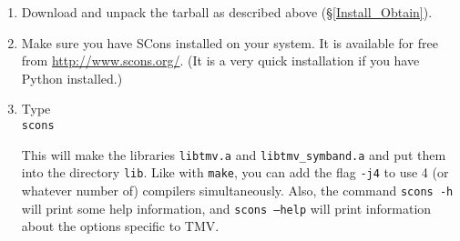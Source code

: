 \documentclass[twoside,letterpaper,11pt]{article}
\begin{document}
\begin{enumerate}
\item Download and unpack the tarball as described above (\S\ref{Install_Obtain}).

\item Make sure you have SCons installed on your system.  
It is available for free from \url{http://www.scons.org/}.  (It is a
very quick installation if you have Python installed.)

\item Type \\
\texttt{scons}

This will make the libraries \texttt{libtmv.a} and \texttt{libtmv\_symband.a}
and put them into the directory \texttt{lib}.  Like with \texttt{make}, you can add
the flag \texttt{-j4} to use 4 (or whatever number of) compilers simultaneously.
Also, the command \texttt{scons -h} will print some help information, and \texttt{scons --help}
will print information about the options specific to TMV.


\end{enumerate}
\end{document}
